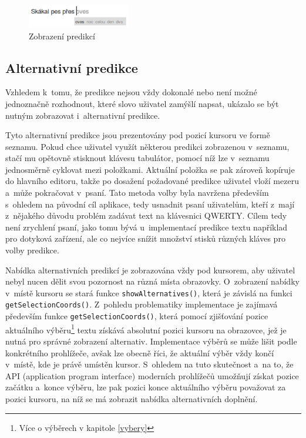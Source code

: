 \documentclass[a4paper,11pt,openany]{book} %
\begin{document}
\begin{figure}[ht]
	\centering
	\includegraphics[width=0.4\textwidth]{nlp_predict_1}
	\caption{Zobrazení predikcí}
	\label{fig:nlp-predict}
\end{figure}

\subsection{Alternativní predikce}

Vzhledem k~tomu, že predikce nejsou vždy dokonalé nebo není možné jednoznačně rozhodnout, které slovo uživatel zamýšlí napsat, ukázalo se být nutným zobrazovat i~alternativní predikce. 

Tyto alternativní predikce jsou prezentovány pod pozicí kursoru ve formě seznamu. Pokud chce uživatel využít některou predikci zobrazenou v~seznamu, stačí mu opětovně stisknout klávesu tabulátor, pomocí níž lze v~seznamu jednosměrně cyklovat mezi položkami. Aktuální položka se pak zároveň kopíruje do hlavního editoru, takže po dosažení požadované predikce uživatel vloží mezeru a~může pokračovat v~psaní. Tato metoda volby byla navržena především s~ohledem na původní cíl aplikace, tedy usnadnit psaní uživatelům, kteří z~mají z~nějakého důvodu problém zadávat text na klávesnici QWERTY. Cílem tedy není zrychlení psaní, jako tomu bývá u~implementací predikce textu například pro dotyková zařízení, ale co nejvíce snížit množství stisků různých kláves pro volby predikce.

Nabídka alternativních predikcí je zobrazována vždy pod kursorem, aby uživatel nebyl nucen dělit svou pozornost na různá místa obrazovky. O~zobrazení nabídky v~místě kursoru se stará funkce {\tt show\-Alternatives()}, která je závislá na funkci {\tt get\-Selection\-Coords()}. Z~pohledu problematiky implementace je zajímavá především funkce {\tt get\-Selection\-Coords()}, která pomocí zjišťování pozice aktuálního výběru\footnote{Více o výběrech v kapitole \ref{vybery}} textu získává absolutní pozici kursoru na obrazovce, jež je nutná pro správné zobrazení alternativ. Implementace výběrů se může lišit podle konkrétního prohlížeče, avšak lze obecně říci, že aktuální výběr vždy končí v~místě, kde je právě umístěn kursor. S~ohledem na tuto skutečnost a~na to, že API (application program interface) moderních prohlížečů umožňují získat pozice začátku a~konce výběru, lze pak pozici konce aktuálního výběru považovat za pozici kursoru, na níž se má zobrazit nabídka alternativních doplnění. 
\end{document}
